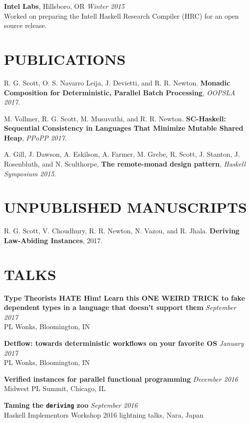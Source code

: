 \documentclass{res}
\begin{document}
\begin{resume}
    \textbf{Intel Labs}, Hillsboro, OR \hfill \textit{Winter 2015} \\
    Worked on preparing the Intell Haskell Research Compiler (HRC) for an open source release.

\section{PUBLICATIONS}
    R. G. Scott, O. S. Navarro Leija, J. Devietti, and R. R. Newton. \textbf{Monadic Composition for Deterministic, Parallel Batch Processing}, \textit{OOPSLA 2017}.

    M. Vollmer, R. G. Scott, M. Musuvathi, and R. R. Newton. \textbf{SC-Haskell: Sequential Consistency in Languages That Minimize Mutable Shared Heap}, \textit{PPoPP 2017}.

    A. Gill, J. Dawson, A. Eskilson, A. Farmer, M. Grebe, R. Scott, J. Stanton, J. Rosenbluth, and N. Sculthorpe, \textbf{The remote-monad design pattern}, \textit{Haskell Symposium 2015}.


\section{UNPUBLISHED MANUSCRIPTS}
    R. G. Scott, V. Choudhury, R. R. Newton, N. Vazou, and R. Jhala. \textbf{Deriving Law-Abiding Instances}, 2017.

\section{TALKS}
    \textbf{Type Theorists HATE Him! Learn this ONE WEIRD TRICK to fake dependent types in a language that doesn’t support them} \hfill \textit{September 2017} \\
    PL Wonks, Bloomington, IN

    \textbf{Detflow: towards deterministic workflows on your favorite OS} \hfill \textit{January 2017} \\
    PL Wonks, Bloomington, IN

    \textbf{Verified instances for parallel functional programming} \hfill \textit{December 2016} \\
    Midwest PL Summit, Chicago, IL

    \textbf{Taming the \texttt{deriving} zoo} \hfill \textit{September 2016} \\
    Haskell Implementors Workshop 2016 lightning talks, Nara, Japan


\end{resume}
\end{document}
